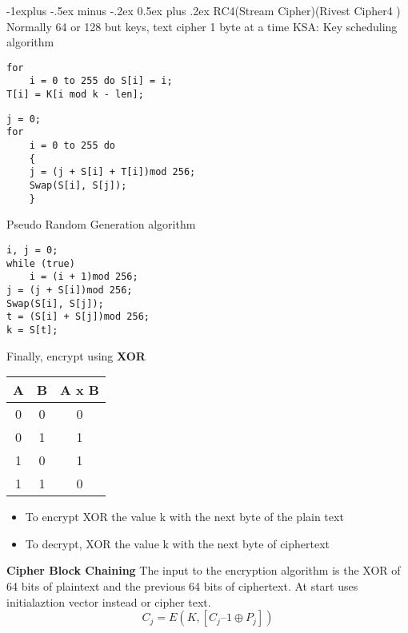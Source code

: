 \documentclass[10pt,landscape]{article}
\makeatletter
\renewcommand{\subsection}{\@startsection{subsection}{2}{0mm}%
    {-1explus -.5ex minus -.2ex}%
    {0.5ex plus .2ex}%
    {\normalfont\normalsize\bfseries}}
\makeatother
\begin{document}
\begin{multicols}{3}
\subsection{RC4(Stream Cipher)(Rivest Cipher4 )}
Normally 64 or 128 but keys, text cipher 1 byte at a time
KSA: Key scheduling algorithm
\lstset{language=bash,label= ,caption= ,captionpos=b,numbers=none}
\begin{lstlisting}
for
    i = 0 to 255 do S[i] = i;
T[i] = K[i mod k - len];
\end{lstlisting}

\lstset{language=bash,label= ,caption= ,captionpos=b,numbers=none}
\begin{lstlisting}
j = 0;
for
    i = 0 to 255 do
    {
    j = (j + S[i] + T[i])mod 256;
    Swap(S[i], S[j]);
    }
\end{lstlisting}

Pseudo Random Generation algorithm
\lstset{language=bash,label= ,caption= ,captionpos=b,numbers=none}
\begin{lstlisting}
i, j = 0;
while (true)
    i = (i + 1)mod 256;
j = (j + S[i])mod 256;
Swap(S[i], S[j]);
t = (S[i] + S[j])mod 256;
k = S[t];
\end{lstlisting}
Finally, encrypt using \textbf{XOR}

\begin{center}
\begin{tabular}{ |c|c|c| } 
 \hline
 A & B & A x B \\ 
 \hline
 0 & 0 & 0 \\ 
 0 & 1 & 1 \\ 
 1 & 0 & 1 \\ 
 1 & 1 & 0 \\ 
 \hline
\end{tabular}
\end{center}

\begin{itemize}
\item To encrypt XOR the value k with the next byte of the plain text
\item To decrypt, XOR the value k with the next byte of ciphertext
\end{itemize}

\textbf{Cipher Block Chaining} The input to the encryption algorithm is the XOR of 64 bits of
plaintext and the previous 64 bits of ciphertext. At start uses initialaztion vector instead or cipher text.
\lstset{language=bash,label= ,caption= ,captionpos=b,numbers=none}
\[C_j= E(K, [C_j–1 \oplus P_j])\]


\end{multicols}
\end{document}
